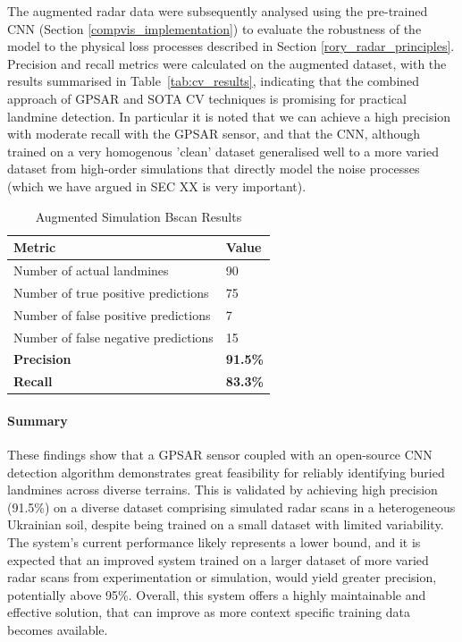         The augmented radar data were subsequently analysed using the pre-trained CNN (Section \ref{compvis_implementation}) to evaluate the robustness of the model to the physical loss processes described in Section \ref{rory_radar_principles}. Precision and recall metrics were calculated on the augmented dataset, with the results summarised in Table~\ref{tab:cv_results}, indicating that the combined approach of GPSAR and SOTA CV techniques is promising for practical landmine detection. In particular it is noted that we can achieve a high precision with moderate recall with the GPSAR sensor, and that the CNN, although trained on a very homogenous 'clean' dataset generalised well to a more varied dataset from high-order simulations that directly model the noise processes (which we have argued in SEC XX is very important).

        \begin{table}[htbp]
          \centering
          \caption{Augmented Simulation Bscan Results}
          \begin{tabular}{@{} l l @{}} 
            \toprule
            \textbf{Metric} & \textbf{Value} \\
            \midrule
            Number of actual landmines & 90 \\
            Number of true positive predictions & 75 \\
            Number of false positive predictions & 7 \\
            Number of false negative predictions &  15\\
            \midrule
            \textbf{Precision} &  \textbf{91.5\%}\\
            \textbf{Recall} & \textbf{83.3\%}\\
            \bottomrule
          \end{tabular}
        \end{table}       
        
        \paragraph{Summary} These findings show that a GPSAR sensor coupled with an open-source CNN detection algorithm demonstrates great feasibility for reliably identifying buried landmines across diverse terrains. This is validated by achieving high precision (91.5\%) on a diverse dataset comprising simulated radar scans in a heterogeneous Ukrainian soil, despite being trained on a small dataset with limited variability. The system's current performance likely represents a lower bound, and it is expected that an improved system trained on a larger dataset of more varied radar scans from experimentation or simulation, would yield greater precision, potentially above 95\%. Overall, this system offers a highly maintainable and effective solution, that can improve as more context specific training data becomes available.